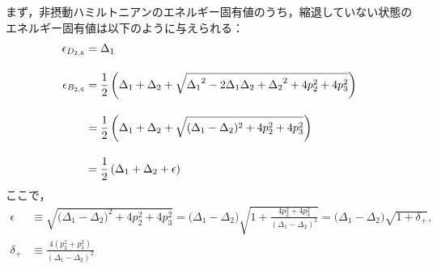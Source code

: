 まず，非摂動ハミルトニアンのエネルギー固有値のうち，縮退していない状態のエネルギー固有値は以下のように与えられる：
\begin{align}
    \epsilon_{D_{2,6}}&=
    {\Delta_{1}}\\[10pt]
    \epsilon_{B_{2,6}}&=
   \frac{1}{2}\left({\Delta_{1}}+{\Delta_{2}}+\sqrt{{\Delta_{1}}^2-2{\Delta_{1}}{\Delta_{2}}+{\Delta_{2}}^2+4p_2^2+4p_3^2}\right)\nn[10pt]
    &=\frac{1}{2}\left({\Delta_{1}}+{\Delta_{2}}
    +\sqrt{{
    (\Delta_{1}}-{\Delta_{2}})^2+4p_2^2+4p_3^2}\right)\nn[10pt]
    &=\frac{1}{2}\left({\Delta_{1}}+{\Delta_{2}}+\epsilon\right)
\end{align}
ここで，
\begin{align}
    \epsilon&\equiv
    \sqrt{{
    (\Delta_{1}}-{\Delta_{2}})^2+4p_2^2+4p_3^2}
    ={(\Delta_{1}}-{\Delta_{2}})
    \sqrt{1+\frac{4p_2^2+4p_3^2}{(\Delta_{1}-\Delta_{2})^2}}
    ={(\Delta_{1}}-{\Delta_{2}})\sqrt{1+\delta_+},\\[10pt]
    \delta_+ &\equiv \frac{4(p_2^2+p_3^2)}{(\Delta_{1}-\Delta_{2})^2}
\end{align}
